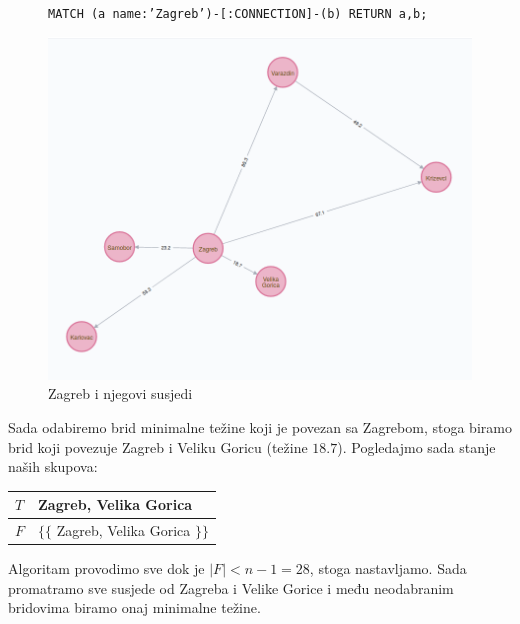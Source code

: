 \documentclass[10pt]{scrartcl}
\begin{document}
\begin{figure}[H]
\texttt{MATCH (a {name:'Zagreb'})-[:CONNECTION]-(b) RETURN a,b;}
\caption{Zagreb i njegovi susjedi}
\begin{center}
\includegraphics[scale=0.3]{Zagreb}
\end{center}
\end{figure}

Sada odabiremo brid minimalne težine koji je povezan sa Zagrebom, stoga biramo brid koji povezuje Zagreb i Veliku
Goricu (težine $18.7$). Pogledajmo sada stanje naših skupova:
\newline

\begin{tabular}{|l|l|}
\hline
 $T$ &  Zagreb, Velika Gorica\\ \hline
 $F$ &  $\{\{$ Zagreb, Velika Gorica $\}\}$\\ \hline
\end{tabular}
\newline

Algoritam provodimo sve dok je $|F| < n-1 = 28$, stoga nastavljamo. Sada promatramo sve susjede od Zagreba i Velike Gorice i
među neodabranim bridovima biramo onaj minimalne težine. 
\end{document}
